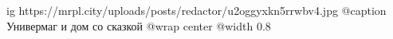  
 
 
 
 

\ifcmt
  ig https://mrpl.city/uploads/posts/redactor/u2oggyxkn5rrwbv4.jpg
	@caption Универмаг и дом со сказкой
  @wrap center
  @width 0.8
\fi
